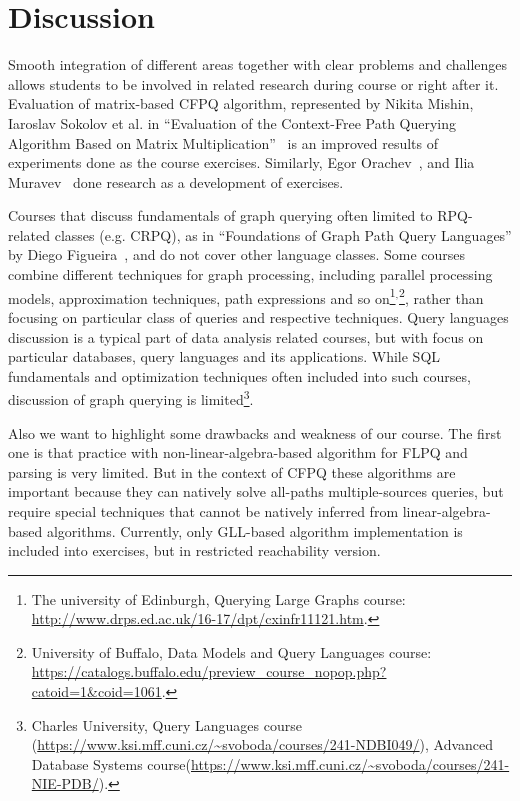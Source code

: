 \documentclass[sigconf]{acmart}
\begin{document}
\section{Discussion}

Smooth integration of different areas together with clear problems and challenges allows students to be involved in related research during course or right after it. 
Evaluation of matrix-based CFPQ algorithm, represented by Nikita Mishin, Iaroslav Sokolov et al. in ``Evaluation of the Context-Free Path Querying Algorithm Based on Matrix Multiplication''~\cite{10.1145/3327964.3328503} is an improved results of experiments done as the course exercises. 
Similarly, Egor Orachev~\cite{10.1007/978-3-030-54832-2_6}, and Ilia Muravev~\cite{muravev2024optimizationcontextfreelanguagereachability} done research as a development of exercises.

Courses that discuss fundamentals of graph querying often limited to RPQ-related classes (e.g. CRPQ), as in ``Foundations of Graph Path Query Languages'' by Diego Figueira~\cite{Figueira2022}, and do not cover other language classes. 
Some courses combine different techniques for graph processing, including parallel processing models, approximation techniques, path expressions and so on\footnote{The university of Edinburgh, Querying Large Graphs course: \url{http://www.drps.ed.ac.uk/16-17/dpt/cxinfr11121.htm}.}$^{,}$\footnote{University of Buffalo, Data Models and Query Languages course: \url{https://catalogs.buffalo.edu/preview_course_nopop.php?catoid=1&coid=1061}.}, rather than focusing on particular class of queries and respective techniques.
Query languages discussion is a typical part of data analysis related courses, but with focus on particular databases, query languages and its applications.
While SQL fundamentals and optimization techniques often included into such courses, discussion of graph querying is limited\footnote{Charles University, Query Languages course (\url{https://www.ksi.mff.cuni.cz/~svoboda/courses/241-NDBI049/}), Advanced Database Systems course(\url{https://www.ksi.mff.cuni.cz/~svoboda/courses/241-NIE-PDB/}).}.


Also we want to highlight some drawbacks and weakness of our course.
The first one is that practice with non-linear-algebra-based algorithm for FLPQ and parsing is very limited. 
But in the context of CFPQ these algorithms are important because they can natively solve all-paths multiple-sources queries, but require special techniques that cannot be natively inferred from linear-algebra-based algorithms.
Currently, only GLL-based algorithm implementation is included into exercises, but in restricted reachability version.
\end{document}
